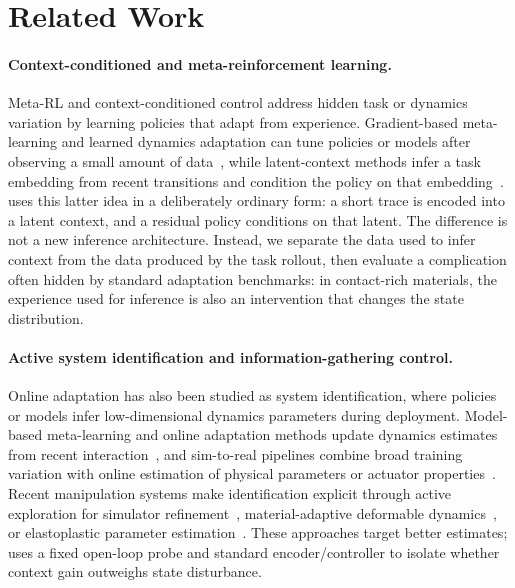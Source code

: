\section{Related Work}
\label{sec:related}

\paragraph{Context-conditioned and meta-reinforcement learning.}
Meta-RL and context-conditioned control address hidden task or dynamics variation by learning policies that adapt from experience. Gradient-based meta-learning and learned dynamics adaptation can tune policies or models after observing a small amount of data~\cite{finn2017model,nagabandi2019learning}, while latent-context methods infer a task embedding from recent transitions and condition the policy on that embedding~\cite{rakelly2019efficient,zintgraf2021varibad}. \PTA{} uses this latter idea in a deliberately ordinary form: a short trace is encoded into a latent context, and a residual policy conditions on that latent. The difference is not a new inference architecture. Instead, we separate the data used to infer context from the data produced by the task rollout, then evaluate a complication often hidden by standard adaptation benchmarks: in contact-rich materials, the experience used for inference is also an intervention that changes the state distribution.

\paragraph{Active system identification and information-gathering control.}
Online adaptation has also been studied as system identification, where policies or models infer low-dimensional dynamics parameters during deployment. Model-based meta-learning and online adaptation methods update dynamics estimates from recent interaction~\cite{nagabandi2018deep,clavera2019modelbased}, and sim-to-real pipelines combine broad training variation with online estimation of physical parameters or actuator properties~\cite{yu2017preparing,peng2018sim2real}. Recent manipulation systems make identification explicit through active exploration for simulator refinement~\cite{memmel2024asid}, material-adaptive deformable dynamics~\cite{zhang2024adaptigraph}, or elastoplastic parameter estimation~\cite{yang2025differentiable}. These approaches target better estimates; \PTA{} uses a fixed open-loop probe and standard encoder/controller to isolate whether context gain outweighs state disturbance.

